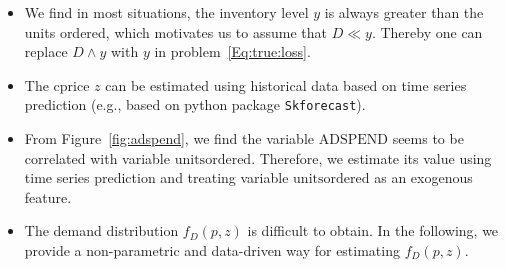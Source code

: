 \documentclass[competition,nonblindrev, 12pt]{informs3-competition}
\theoremstyle{TH}%
\theoremstyle{TH}%
\begin{document}
\begin{itemize}
    \item 
We find in most situations, the inventory level $y$ is always greater than the units ordered, which motivates us to assume that $D\ll y$.
Thereby one can replace $D\land y$ with $y$ in problem~\eqref{Eq:true:loss}.
    \item
The cprice $z$ can be estimated using historical data based on time series prediction (e.g., based on python package \texttt{Skforecast}).
\end{itemize}

\begin{itemize}
    \item
From Figure~\ref{fig:adspend}, we find the variable $\mathrm{ADSPEND}$ seems to be correlated with variable $\mathrm{unitsordered}$.
Therefore, we estimate its value using time series prediction and treating variable $\mathrm{unitsordered}$ as an exogenous feature.
\item
The demand distribution $f_D(p,z)$ is difficult to obtain. In the following, we provide a non-parametric and data-driven way for estimating $f_D(p,z)$.%
\end{itemize}

    
 


    
\end{document}
